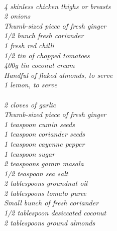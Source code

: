 \documentclass{tufte-book}
\begin{document}
\smallskip
{}
\\\emph{4 skinless chicken thighs or breasts
\\2 onions
\\Thumb-sized piece of fresh ginger
\\1/2 bunch fresh coriander
\\1 fresh red chilli
\\1/2 tin of chopped tomatoes
\\400g tin coconut cream
\\Handful of flaked almonds, to serve
\\1 lemon, to serve}
\\
\\\emph{2 cloves of garlic
\\Thumb-sized piece of fresh ginger
\\1 teaspoon cumin seeds
\\1 teaspoon coriander seeds
\\1 teaspoon cayenne pepper
\\1 teaspoon sugar
\\2 teaspoons garam masala
\\1/2 teaspoon sea salt
\\2 tablespoons groundnut oil
\\2 tablespoons tomato puree
\\Small bunch of fresh coriander
\\1/2 tablespoon desiccated coconut
\\2 tablespoons ground almonds}
\end{document}
